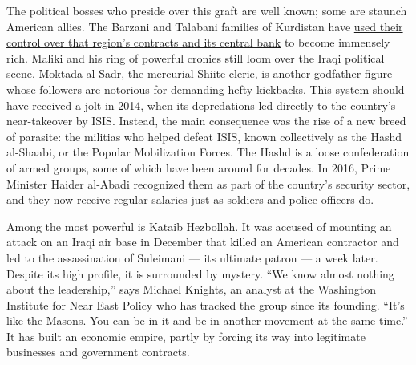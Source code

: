 The political bosses who preside over this graft are well known; some
are staunch American allies. The Barzani and Talabani families of
Kurdistan have
\href{https://newrepublic.com/article/158609/iraq-barzani-pentagon-oil-beverly-hills-mansion}{used
their control over that region's contracts and its central bank} to
become immensely rich. Maliki and his ring of powerful cronies still
loom over the Iraqi political scene. Moktada al-Sadr, the mercurial
Shiite cleric, is another godfather figure whose followers are notorious
for demanding hefty kickbacks. This system should have received a jolt
in 2014, when its depredations led directly to the country's
near-takeover by ISIS. Instead, the main consequence was the rise of a
new breed of parasite: the militias who helped defeat ISIS, known
collectively as the Hashd al-Shaabi, or the Popular Mobilization Forces.
The Hashd is a loose confederation of armed groups, some of which have
been around for decades. In 2016, Prime Minister Haider al-Abadi
recognized them as part of the country's security sector, and they now
receive regular salaries just as soldiers and police officers do.

Among the most powerful is Kataib Hezbollah. It was accused of mounting
an attack on an Iraqi air base in December that killed an American
contractor and led to the assassination of Suleimani --- its ultimate
patron --- a week later. Despite its high profile, it is surrounded by
mystery. ``We know almost nothing about the leadership,'' says Michael
Knights, an analyst at the Washington Institute for Near East Policy who
has tracked the group since its founding. ``It's like the Masons. You
can be in it and be in another movement at the same time.'' It has built
an economic empire, partly by forcing its way into legitimate businesses
and government contracts.


